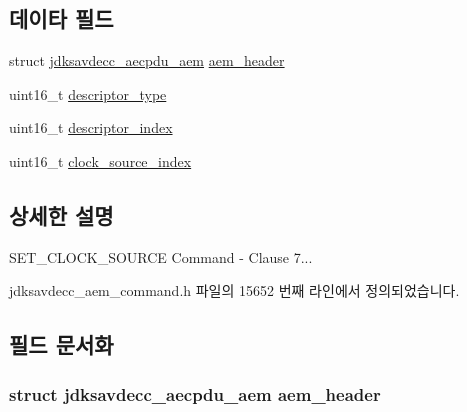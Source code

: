 \subsection*{데이타 필드}
\begin{DoxyCompactItemize}
\item 
struct \hyperlink{structjdksavdecc__aecpdu__aem}{jdksavdecc\+\_\+aecpdu\+\_\+aem} \hyperlink{structjdksavdecc__aem__command__set__clock__source_ae1e77ccb75ff5021ad923221eab38294}{aem\+\_\+header}
\item 
uint16\+\_\+t \hyperlink{structjdksavdecc__aem__command__set__clock__source_ab7c32b6c7131c13d4ea3b7ee2f09b78d}{descriptor\+\_\+type}
\item 
uint16\+\_\+t \hyperlink{structjdksavdecc__aem__command__set__clock__source_a042bbc76d835b82d27c1932431ee38d4}{descriptor\+\_\+index}
\item 
uint16\+\_\+t \hyperlink{structjdksavdecc__aem__command__set__clock__source_ae6d3717453951addecc331540f572e30}{clock\+\_\+source\+\_\+index}
\end{DoxyCompactItemize}


\subsection{상세한 설명}
S\+E\+T\+\_\+\+C\+L\+O\+C\+K\+\_\+\+S\+O\+U\+R\+CE Command -\/ Clause 7... 

jdksavdecc\+\_\+aem\+\_\+command.\+h 파일의 15652 번째 라인에서 정의되었습니다.



\subsection{필드 문서화}
\subsubsection[{\texorpdfstring{aem\+\_\+header}{aem_header}}]{\setlength{\rightskip}{0pt plus 5cm}struct {\bf jdksavdecc\+\_\+aecpdu\+\_\+aem} aem\+\_\+header}\hypertarget{structjdksavdecc__aem__command__set__clock__source_ae1e77ccb75ff5021ad923221eab38294}{}\label{structjdksavdecc__aem__command__set__clock__source_ae1e77ccb75ff5021ad923221eab38294}


